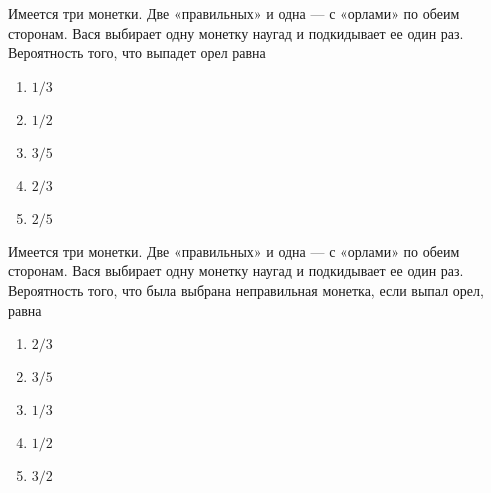 \documentclass[t]{beamer}
\begin{document}
 \begin{frame} \label{5} 
\begin{block}{5} 

Имеется три монетки. Две «правильных» и одна — с «орлами» по обеим сторонам. Вася выбирает одну монетку наугад и подкидывает ее один раз. Вероятность того, что выпадет орел равна
     


 \end{block} 
\begin{enumerate} 
\item[] \hyperlink{5-No}{\beamergotobutton{} $1/3$}
\item[] \hyperlink{5-No}{\beamergotobutton{} $1/2$}
\item[] \hyperlink{5-No}{\beamergotobutton{} $3/5$}
\item[] \hyperlink{5-Yes}{\beamergotobutton{} $2/3$}
\item[] \hyperlink{5-No}{\beamergotobutton{} $2/5$
}
\end{enumerate} 
\end{frame} 


 \begin{frame} \label{6} 
\begin{block}{6} 

Имеется три монетки. Две «правильных» и одна — с «орлами» по обеим сторонам. Вася выбирает одну монетку наугад и подкидывает ее один раз. Вероятность того, что была выбрана неправильная монетка, если выпал орел, равна
   


 \end{block} 
\begin{enumerate} 
\item[] \hyperlink{6-No}{\beamergotobutton{} $2/3$}
\item[] \hyperlink{6-No}{\beamergotobutton{} $3/5$}
\item[] \hyperlink{6-No}{\beamergotobutton{} $1/3$}
\item[] \hyperlink{6-Yes}{\beamergotobutton{} $1/2$}
\item[] \hyperlink{6-No}{\beamergotobutton{} $3/2$
}
\end{enumerate} 
\end{frame} 
\end{document}
